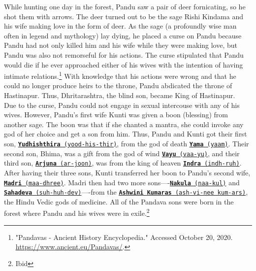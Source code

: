 \documentclass[10pt, letterpaper]{article}
\begin{document}
While hunting one day in the forest, Pandu saw a pair of deer
fornicating, so he shot them with arrows. The deer turned out to be the
sage Rishi Kindama and his wife making love in the form of deer. As the
sage (a profoundly wise man often in legend and mythology) lay dying, he
placed a curse on Pandu because Pandu had not only killed him and his
wife while they were making love, but Pandu was also not remorseful for
his actions. The curse stipulated that Pandu would die if he ever
approached either of his wives with the intention of having intimate
relations.\footnote{"Pandavas - Ancient History Encyclopedia." Accessed
  October 20, 2020.
  \href{https://www.ancient.eu/Pandavas/}{\underline{https://www.ancient.eu/Pandavas/}}.}
With knowledge that his actions were wrong and that he could no longer
produce heirs to the throne, Pandu abdicated the throne of Hastinapur.
Thus, Dhritarashtra, the blind son, became King of Hastinapur. \\

Due to the curse, Pandu could not engage in sexual intercouse with any
of his wives. However, Pandu's first wife Kunti was given a boon
(blessing) from another sage. The boon was that if she chanted a mantra,
she could invoke any god of her choice and get a son from him. Thus,
Pandu and Kunti got their first son,
\texttt{\underline{\href{https://drive.google.com/file/d/1dHaDih0_FCGK9IaZ9dmPu9QiL1iJIu2U/view?usp=sharing}{\textbf{Yudhishthira}}
(yood-his-thir)}}, from the god of death
\texttt{\underline{\href{https://drive.google.com/file/d/1La94GsbuOIy-rix4BHMg0Tzy2OBtlPXC/view?usp=sharing}{\textbf{Yama}}
(yaam)}}. Their second son, Bhima, was a gift from the god of wind
\texttt{\underline{\href{https://drive.google.com/file/d/168kEEnStpOVtdu9epuk19b5McRbLB53-/view?usp=sharing}{\textbf{Vayu}}
(vaa-yu)}}, and their third son,
\texttt{\underline{\href{https://drive.google.com/file/d/1OymnP6tbvSLX3VR0o16n-NMKHkrhL8qt/view?usp=sharing}{\textbf{Arjuna}}
(ar-joon)}}, was from the king of heaven
\texttt{\underline{\href{https://drive.google.com/file/d/1lUnkqGozjpFi9nhVtd4Biq3SyFwb3o4g/view?usp=sharing}{\textbf{Indra}}
(indh-ruh)}}. After having their three sons, Kunti transferred her boon
to Pandu's second wife,
\texttt{\underline{\href{https://drive.google.com/file/d/1pMTyMAA9wdBqE6WSLOLpjUGlxoaEGpwF/view?usp=sharing}{\textbf{Madri}}
(maa-dhree)}}. Madri then had two more
sons----\texttt{\underline{\href{https://drive.google.com/file/d/1u-QMw8C7J2NHIyzaA-0XnRQ6t3Qsihaq/view?usp=sharing}{\textbf{Nakula}}
(naa-kul)}} and
\texttt{\underline{\href{https://drive.google.com/file/d/1lvmEuwtmY9J6ANDS-rBD4-8ZyXIqjKH0/view?usp=sharing}{\textbf{Sahadeva}}
(suh-huh-dev)}}----from the
\texttt{\underline{\href{https://drive.google.com/file/d/1zBC2Yhh5JPbpFRagdS72vNfFWh1ug4VC/view?usp=sharing}{\textbf{Ashwini
Kumaras}} (ash-vi-nee kum-ars)}}, the Hindu Vedic gods of medicine. All
of the Pandava sons were born in the forest where Pandu and his wives
were in exile.\footnote{Ibid} \\
\end{document}
